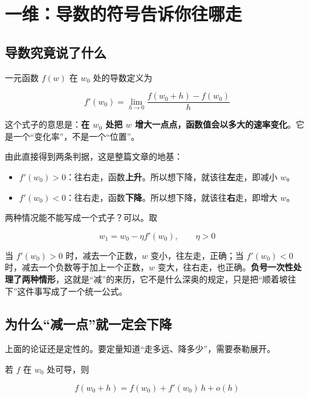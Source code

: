 \documentclass[UTF8, a4paper, zihao=-4, fontset=none]{ctexart}
\begin{document}
\section{一维：导数的符号告诉你往哪走}




\subsection{导数究竟说了什么}



一元函数 $f(w)$ 在 $w_0$ 处的导数定义为


\[
f'(w_0)=\lim_{h\to 0}\frac{f(w_0+h)-f(w_0)}{h}
\]


这个式子的意思是：\textbf{在 $w_0$ 处把 $w$ 增大一点点，函数值会以多大的速率变化}。它是一个“变化率”，不是一个“位置”。



由此直接得到两条判据，这是整篇文章的地基：



\begin{itemize}
\item $f'(w_0)>0$：往右走，函数\textbf{上升}。所以想下降，就该往\textbf{左}走，即减小 $w$。
\item $f'(w_0)<0$：往右走，函数\textbf{下降}。所以想下降，就该往\textbf{右}走，即增大 $w$。
\end{itemize}



两种情况能不能写成一个式子？可以。取


\[
w_1=w_0-\eta f'(w_0),\qquad \eta>0
\]


当 $f'(w_0)>0$ 时，减去一个正数，$w$ 变小，往左走，正确；当 $f'(w_0)<0$ 时，减去一个负数等于加上一个正数，$w$ 变大，往右走，也正确。\textbf{负号一次性处理了两种情形}，这就是“减”的来历，它不是什么深奥的规定，只是把“顺着坡往下”这件事写成了一个统一公式。




\subsection{为什么“减一点”就一定会下降}



上面的论证还是定性的。要定量知道“走多远、降多少”，需要泰勒展开。



若 $f$ 在 $w_0$ 处可导，则


\[
f(w_0+h)=f(w_0)+f'(w_0)\,h+o(h)
\]
\end{document}
